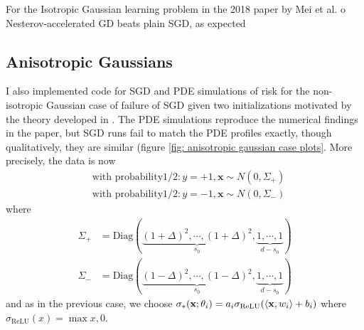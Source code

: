 \documentclass{article}
\begin{document}
	For the Isotropic Gaussian learning problem in the 2018 paper by Mei et al.
o	Nesterov-accelerated GD beats plain SGD, as expected


\subsection{Anisotropic Gaussians}

I also implemented code for SGD and PDE simulations of risk for the non-isotropic Gaussian case of failure of SGD given two initializations motivated by the theory developed in \cite{Mei_2018}. The PDE simulations reproduce the numerical findings in the paper, but SGD runs fail to match the PDE profiles exactly, though qualitatively, they are similar (figure \ref{fig: anisotropic gaussian case plots}. More precisely, the data is now 
\begin{equation}
\begin{array}{cc}
& \text{with probability}  1/2: y = +1, \mathbf{x}\sim N(0, \Sigma_+)\\
& \text{with probability}  1/2: y = -1, \mathbf{x}\sim N(0, \Sigma_-)
\end{array}
\end{equation}
where 
\begin{equation}
\begin{array}{cc}
	\Sigma_+ &= \text{Diag}(\underbrace{(1+\Delta)^{2}, \cdots, (1+\Delta)^{2}}_{s_0}, \underbrace{1,\cdots, 1}_{d-s_0})\\ 
 \Sigma_- &= \text{Diag}(\underbrace{(1-\Delta)^{2}, \cdots, (1-\Delta)^{2}}_{s_0}, \underbrace{1,\cdots, 1}_{d-s_0})
\end{array}
\end{equation}
and as in the previous case, we choose $\sigma_*(\mathbf{x};\mathbf{\theta}_{i})=a_{i}\sigma_{\text{ReLU}}(\langle \mathbf{x}, w_{i}\rangle+b_{i})$  where $ \sigma_{\text{ReLU}}(x) = \max{x,0}$.
\end{document}
